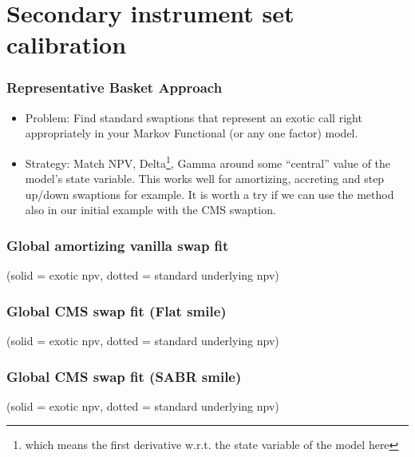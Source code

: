 \documentclass{beamer}
\begin{document}
\section{Secondary instrument set calibration}

\begin{frame}[fragile]
\frametitle{Representative Basket Approach}
\begin{itemize}
\item Problem: Find standard swaptions that represent an exotic call right
appropriately in your Markov Functional (or any one factor) model.
\item Strategy: Match NPV, Delta\footnote{which means the first derivative
w.r.t. the state variable of the model here}, Gamma around some ``central''
value of the model's state variable.
This works well for amortizing, accreting and step up/down swaptions for
example. It is worth a try if we can use the method also in our initial
example with the CMS swaption.
\end{itemize}
\end{frame}

\begin{frame}[fragile]
\frametitle{Global amortizing vanilla swap fit}
(solid = exotic npv, dotted = standard underlying npv)
\end{frame}


\begin{frame}[fragile]
\frametitle{Global CMS swap fit (Flat smile)}
(solid = exotic npv, dotted = standard underlying npv)
\end{frame}

\begin{frame}[fragile]
\frametitle{Global CMS swap fit (SABR smile)}
(solid = exotic npv, dotted = standard underlying npv)
\end{frame}
\end{document}

